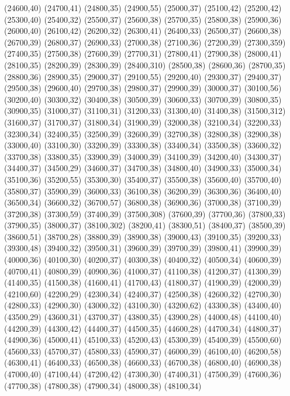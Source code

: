 (24600,40)
(24700,41)
(24800,35)
(24900,55)
(25000,37)
(25100,42)
(25200,42)
(25300,40)
(25400,32)
(25500,37)
(25600,38)
(25700,35)
(25800,38)
(25900,36)
(26000,40)
(26100,42)
(26200,32)
(26300,41)
(26400,33)
(26500,37)
(26600,38)
(26700,39)
(26800,37)
(26900,33)
(27000,38)
(27100,36)
(27200,39)
(27300,359)
(27400,35)
(27500,38)
(27600,39)
(27700,31)
(27800,41)
(27900,38)
(28000,41)
(28100,35)
(28200,39)
(28300,39)
(28400,310)
(28500,38)
(28600,36)
(28700,35)
(28800,36)
(28900,35)
(29000,37)
(29100,55)
(29200,40)
(29300,37)
(29400,37)
(29500,38)
(29600,40)
(29700,38)
(29800,37)
(29900,39)
(30000,37)
(30100,56)
(30200,40)
(30300,32)
(30400,38)
(30500,39)
(30600,33)
(30700,39)
(30800,35)
(30900,35)
(31000,37)
(31100,31)
(31200,33)
(31300,40)
(31400,38)
(31500,312)
(31600,37)
(31700,37)
(31800,34)
(31900,39)
(32000,38)
(32100,34)
(32200,33)
(32300,34)
(32400,35)
(32500,39)
(32600,39)
(32700,38)
(32800,38)
(32900,38)
(33000,40)
(33100,30)
(33200,39)
(33300,38)
(33400,34)
(33500,38)
(33600,32)
(33700,38)
(33800,35)
(33900,39)
(34000,39)
(34100,39)
(34200,40)
(34300,37)
(34400,37)
(34500,29)
(34600,37)
(34700,38)
(34800,40)
(34900,33)
(35000,34)
(35100,36)
(35200,55)
(35300,30)
(35400,37)
(35500,38)
(35600,40)
(35700,40)
(35800,37)
(35900,39)
(36000,33)
(36100,38)
(36200,39)
(36300,36)
(36400,40)
(36500,34)
(36600,32)
(36700,57)
(36800,38)
(36900,36)
(37000,38)
(37100,39)
(37200,38)
(37300,59)
(37400,39)
(37500,308)
(37600,39)
(37700,36)
(37800,33)
(37900,35)
(38000,37)
(38100,302)
(38200,41)
(38300,51)
(38400,37)
(38500,39)
(38600,51)
(38700,28)
(38800,39)
(38900,38)
(39000,43)
(39100,35)
(39200,33)
(39300,48)
(39400,32)
(39500,31)
(39600,39)
(39700,39)
(39800,41)
(39900,39)
(40000,36)
(40100,30)
(40200,37)
(40300,38)
(40400,32)
(40500,34)
(40600,39)
(40700,41)
(40800,39)
(40900,36)
(41000,37)
(41100,38)
(41200,37)
(41300,39)
(41400,35)
(41500,38)
(41600,41)
(41700,43)
(41800,37)
(41900,39)
(42000,39)
(42100,60)
(42200,29)
(42300,34)
(42400,37)
(42500,38)
(42600,32)
(42700,30)
(42800,33)
(42900,30)
(43000,32)
(43100,30)
(43200,62)
(43300,38)
(43400,40)
(43500,29)
(43600,31)
(43700,37)
(43800,35)
(43900,28)
(44000,48)
(44100,40)
(44200,39)
(44300,42)
(44400,37)
(44500,35)
(44600,28)
(44700,34)
(44800,37)
(44900,36)
(45000,41)
(45100,33)
(45200,43)
(45300,39)
(45400,39)
(45500,60)
(45600,33)
(45700,37)
(45800,33)
(45900,37)
(46000,39)
(46100,40)
(46200,58)
(46300,41)
(46400,33)
(46500,38)
(46600,33)
(46700,38)
(46800,40)
(46900,38)
(47000,40)
(47100,44)
(47200,42)
(47300,30)
(47400,31)
(47500,39)
(47600,36)
(47700,38)
(47800,38)
(47900,34)
(48000,38)
(48100,34)
